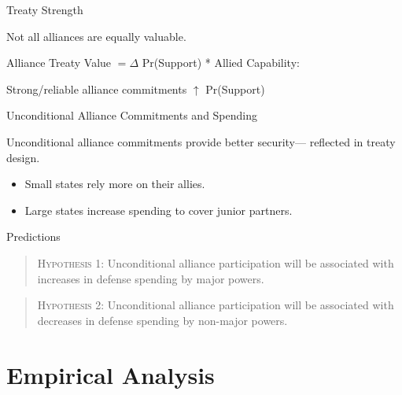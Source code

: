 \documentclass{beamer}
\begin{document}

\begin{frame}{Treaty Strength}

Not all alliances are equally valuable. 

\pause

Alliance Treaty Value $= \Delta$ Pr(Support) * Allied Capability:

\pause

Strong/reliable alliance commitments $\uparrow$ Pr(Support)


\end{frame}


\begin{frame}{Unconditional Alliance Commitments and Spending}

Unconditional alliance commitments provide better security--- reflected in treaty design. 

\pause

\begin{itemize}
\item Small states rely more on their allies. 
\pause
\item Large states increase spending to cover junior partners.  
\end{itemize}


\end{frame}



\begin{frame}{Predictions}


\begin{quote}
\textsc{Hypothesis 1}: Unconditional alliance participation will be associated with increases in defense spending by major powers. 
\end{quote} 

\pause

\begin{quote}
\textsc{Hypothesis 2}: Unconditional alliance participation will be associated with decreases in defense spending by non-major powers. 
\end{quote} 


\end{frame}


\section{Empirical Analysis} 
\end{document}
